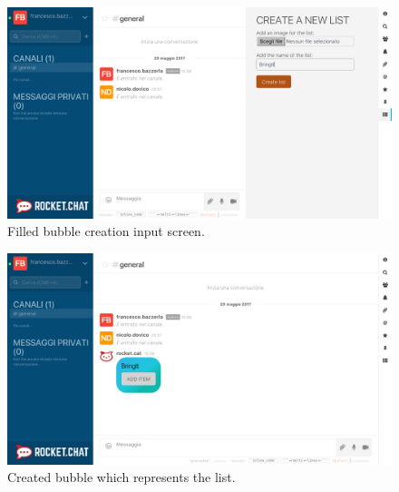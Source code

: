 \begin{figure}[H]
  \centering 
  \includegraphics[width=\textwidth]{Sections/3-HowToUse/Images/list_create_filled.png}
  \caption{Filled bubble creation input screen.}
\end{figure}

\begin{figure}[H]
  \centering 
  \includegraphics[width=\textwidth]{Sections/3-HowToUse/Images/bubble_empty.png}
  \caption{Created bubble which represents the list.}
\end{figure}